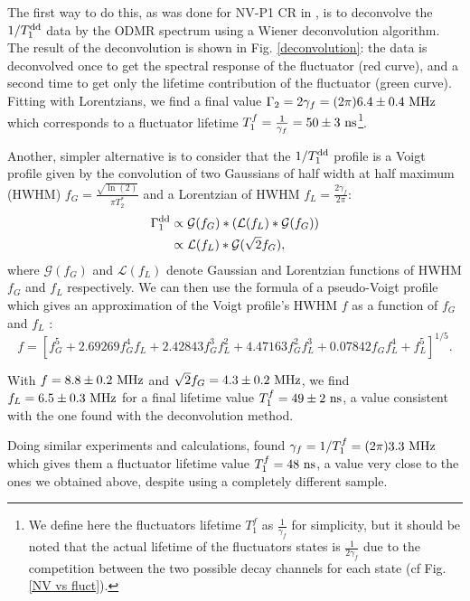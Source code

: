 \documentclass[a4paper,11pt]{report}
\begin{document}
The first way to do this, as was done for NV-P1 CR in \citep{hall2016detection}, is to deconvolve the $1/T_1^{\rm dd}$ data by the ODMR spectrum using a Wiener deconvolution algorithm. The result of the deconvolution is shown in Fig. \ref{deconvolution}: the data is deconvolved once to get the spectral response of the fluctuator (red curve), and a second time to get only the lifetime contribution of the fluctuator (green curve). Fitting with Lorentzians, we find a final value $\Gamma_2 =2\gamma_f= (2\pi) 6.4 \pm 0.4\ \rm MHz$ which corresponds to a fluctuator lifetime $T_1^f=\frac{1}{\gamma_f}=50 \pm 3\ \rm ns$\footnote{We define here the fluctuators lifetime $T_1^f$ as $\frac{1}{\gamma_f}$ for simplicity, but it should be noted that the actual lifetime of the fluctuators states is $\frac{1}{2\gamma_f}$ due to the competition between the two possible decay channels for each state (cf Fig. \ref{NV vs fluct}).}.

Another, simpler alternative is to consider that the $1/T_1^{\rm dd}$ profile is a Voigt profile given by the convolution of two Gaussians of half width at half maximum (HWHM) $f_G=\frac{\sqrt{\ln (2)}}{\pi T_2^*}$ and a Lorentzian of HWHM $f_L=\frac{2 \gamma_f}{2 \pi}$:
\begin{align*}
\Gamma_1^{\rm dd}&\propto \mathcal{G}(f_G)*(\mathcal{L}(f_L)*\mathcal{G}(f_G)) \\
&\propto \mathcal{L}(f_L)*\mathcal{G}(\sqrt{2} f_G),
\end{align*}
where $\mathcal{G}(f_G)$ and $\mathcal{L}(f_L)$ denote Gaussian and Lorentzian functions of HWHM $f_G$ and $f_L$ respectively.
We can then use the formula of a pseudo-Voigt profile which gives an approximation of the Voigt profile's HWHM $f$ as a function of $f_G$ and $f_L$ \citep{ida2000extended}:
\begin{equation}
f = [f_G^5 + 2.69269 f_G^4 f_L + 2.42843 f_G^3 f_L^2 + 4.47163 f_G^2 f_L^3 + 0.07842 f_G f_L^4 + f_L^5]^{1/5}.
\end{equation}

With $f=8.8 \pm 0.2\ \rm MHz$ and $\sqrt{2}f_G=4.3 \pm 0.2\ \rm MHz$, we find $f_L=6.5 \pm 0.3\ \rm MHz$ for a final lifetime value $T_1^f = 49 \pm 2\ \rm ns$, a value consistent with the one found with the deconvolution method.

Doing similar experiments and calculations, \citep{choi2017depolarization} found $\gamma_f=1/T_1^f=(2\pi) 3.3\ \rm MHz$ which gives them a fluctuator lifetime value $T_1^f = 48\ \rm ns$, a value very close to the ones we obtained above, despite using a completely different sample.
\end{document}
